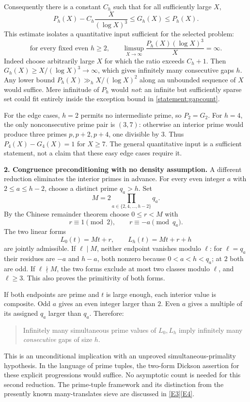 \documentclass[11pt,a4paper]{article}
\newcommand{\eref}[2]{\hyperlink{extra:#1:#2}{[E#2]}}
\numberwithin{equation}{section}
\begin{document}
Consequently there is a constant $C_h$ such that for all sufficiently large
$X$,
\begin{equation}\label{statement:gapcount}
 P_h(X)-C_h\frac{X}{(\log X)^3}\leq G_h(X)\leq P_h(X).
\end{equation}
This estimate isolates a quantitative input sufficient for the selected
problem:
\begin{equation}\label{statement:pairinput}
 \text{for every fixed even $h\geq2$,}\qquad
 \limsup_{X\to\infty}\frac{P_h(X)(\log X)^3}{X}=\infty.
\end{equation}
Indeed choose arbitrarily large $X$ for which the ratio exceeds $C_h+1$.
Then $G_h(X)\geq X/(\log X)^3\to\infty$, which gives infinitely many
consecutive gaps $h$. Any lower bound $P_h(X)\gg_h X/(\log X)^2$ along an
unbounded sequence of $X$ would suffice. Mere infinitude of $P_h$ would
\emph{not}: an infinite but sufficiently sparse set could fit entirely
inside the exception bound in \eqref{statement:gapcount}.

For the edge cases, $h=2$ permits no intermediate prime, so $P_2=G_2$.
For $h=4$, the only nonconsecutive prime pair is $(3,7)$: otherwise an
interior prime would produce three primes $p,p+2,p+4$, one divisible by $3$.
Thus $P_4(X)-G_4(X)=1$ for $X\geq7$. The general quantitative input is a
sufficient statement, not a claim that these easy edge cases require it.

\medskip
\textbf{2. Congruence preconditioning with no density assumption.}
A different reduction eliminates the interior primes in advance. For every
even integer $a$ with $2\leq a\leq h-2$, choose a distinct prime $q_a>h$.
Set
\[
 M=2\prod_{a\in\{2,4,\ldots,h-2\}}q_a.
\]
By the Chinese remainder theorem choose $0\leq r<M$ with
\begin{equation}\label{statement:crt}
 r\equiv1\pmod2,\qquad r\equiv-a\pmod{q_a}.
\end{equation}
The two linear forms
\[
 L_0(t)=Mt+r,\qquad L_h(t)=Mt+r+h
\]
are jointly admissible. If $\ell\mid M$, neither endpoint vanishes modulo
$\ell$: for $\ell=q_a$ their residues are $-a$ and $h-a$, both nonzero
because $0<a<h<q_a$; at $2$ both are odd. If $\ell\nmid M$, the two forms
exclude at most two classes modulo $\ell$, and $\ell\geq3$. This also proves
the primitivity of both forms.

If both endpoints are prime and $t$ is large enough, each interior value
is composite. Odd $a$ gives an even integer larger than $2$. Even $a$ gives
a multiple of its assigned $q_a$ larger than $q_a$. Therefore:
\begin{quote}
Infinitely many simultaneous prime values of $L_0,L_h$ imply infinitely
many \emph{consecutive} gaps of size $h$.
\end{quote}
This is an unconditional implication with an unproved simultaneous-primality
hypothesis. In the language of prime tuples, the two-form Dickson assertion
for these explicit progressions would suffice. No asymptotic count is needed
for this second reduction. The prime-tuple framework and its distinction
from the presently known many-translates sieve are discussed in
\eref{statement}{3}\eref{statement}{4}.
\end{document}
